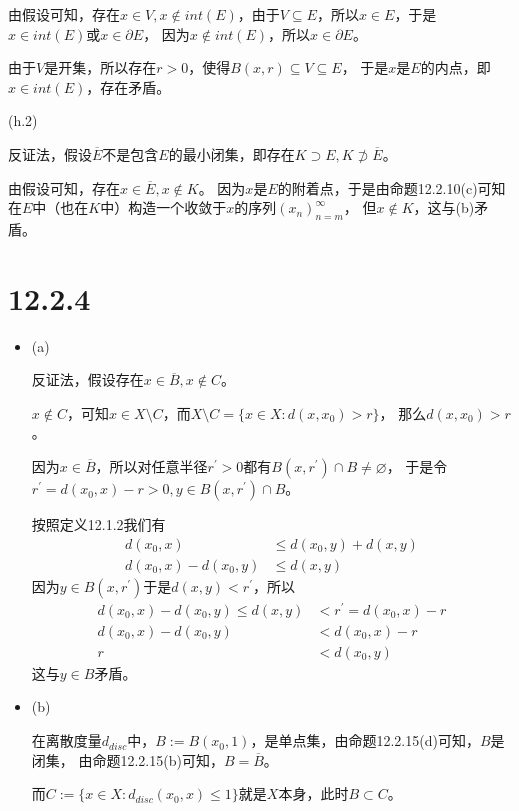 \documentclass{article}
\begin{document}
\begin{itemize}
            由假设可知，存在$x \in V, x \notin int(E)$，由于$V \subseteq E$，所以$x \in E$，于是$x \in int(E)$或$x \in \partial E$，
            因为$x \notin int(E)$，所以$x \in \partial E$。

            由于$V$是开集，所以存在$r > 0$，使得$B(x, r) \subseteq V \subseteq E$，
            于是$x$是$E$的内点，即$x \in int(E)$，存在矛盾。

            (h.2)

            反证法，假设$\overline{E}$不是包含$E$的最小闭集，即存在$K \supset E, K \not \supset \overline{E}$。

            由假设可知，存在$x \in \overline{E}, x \notin K$。
            因为$x$是$E$的附着点，于是由命题12.2.10(c)可知在$E$中（也在$K$中）构造一个收敛于$x$的序列$(x_n)_{n = m}^\infty$，
            但$x \notin K$，这与(b)矛盾。
\end{itemize}

\section*{12.2.4}

\begin{itemize}
      \item (a)

            反证法，假设存在$x \in \overline{B}, x \notin C$。

            $x \notin C$，可知$x \in X \setminus C$，而$X \setminus C = \{x \in X: d(x, x_0) > r\}$，
            那么$d(x, x_0) > r$。

            因为$x \in \overline{B}$，所以对任意半径$r^\prime > 0$都有$B(x, r^\prime) \cap B \neq \varnothing$，
            于是令$r^\prime = d(x_0, x) - r > 0, y \in B(x, r^\prime) \cap B$。

            按照定义12.1.2我们有
            \begin{align*}
                  d(x_0, x)             & \leq d(x_0, y) + d(x, y) \\
                  d(x_0, x) - d(x_0, y) & \leq d(x, y)
            \end{align*}
            因为$y \in B(x, r^\prime)$于是$d(x, y) < r^\prime$，所以
            \begin{align*}
                  d(x_0, x) - d(x_0, y) \leq d(x, y) & < r^\prime = d(x_0, x) - r \\
                  d(x_0, x) - d(x_0, y)              & < d(x_0, x) - r            \\
                  r                                  & < d(x_0, y)                
            \end{align*}
            这与$y \in B$矛盾。


      \item (b)

            在离散度量$d_{disc}$中，$B := B(x_0, 1)$，是单点集，由命题12.2.15(d)可知，$B$是闭集，
            由命题12.2.15(b)可知，$B = \overline{B}$。

            而$C := \{x \in X: d_{disc}(x_0, x) \leq 1\}$就是$X$本身，此时$B \subset C$。
\end{itemize}
\end{document}
